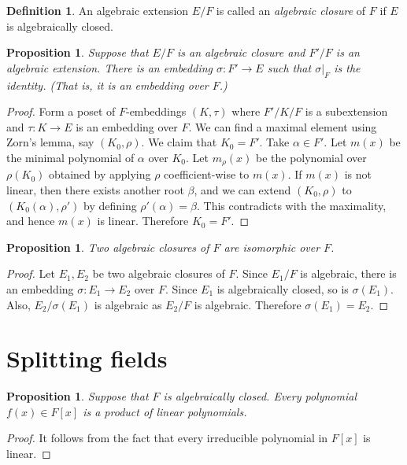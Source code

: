 \documentclass[12pt]{report}
\theoremstyle{plain}
\newtheorem{proposition}[theorem]{Proposition}
\theoremstyle{remark}
\theoremstyle{definition}
\newtheorem{definition}[theorem]{Definition}
\begin{document}
\begin{definition}
    An algebraic extension $E/F$ is called an \emph{algebraic closure} of $F$ if $E$ is algebraically closed.
\end{definition}

\begin{proposition}
    Suppose that $E/F$ is an algebraic closure and $F'/F$ is an algebraic extension. There is an embedding $\sigma:F'\rightarrow E$ such that $\sigma|_F$ is the identity. (That is, it is an embedding over $F$.)
\end{proposition}
\begin{proof}
    Form a poset of $F$-embeddings $(K,\tau)$ where $F'/K/F$ is a subextension and $\tau:K\rightarrow E$ is an embedding over $F$. We can find a maximal element using Zorn's lemma, say $(K_0,\rho)$. We claim that $K_0=F'$. Take $\alpha\in F'$. Let $m(x)$ be the minimal polynomial of $\alpha$ over $K_0$. Let $m_\rho(x)$ be the polynomial over $\rho(K_0)$ obtained by applying $\rho$ coefficient-wise to $m(x)$. If $m(x)$ is not linear, then there exists another root $\beta$, and we can extend $(K_0,\rho)$ to $(K_0(\alpha),\rho')$ by defining $\rho'(\alpha)=\beta$. This contradicts with the maximality, and hence $m(x)$ is linear. Therefore $K_0=F'$.
\end{proof}

\begin{proposition}
    Two algebraic closures of $F$ are isomorphic over $F$.
\end{proposition}
\begin{proof}
    Let $E_1,E_2$ be two algebraic closures of $F$. Since $E_1/F$ is algebraic, there is an embedding $\sigma:E_1\rightarrow E_2$ over $F$. Since $E_1$ is algebraically closed, so is $\sigma(E_1)$. Also, $E_2/\sigma(E_1)$ is algebraic as $E_2/F$ is algebraic. Therefore $\sigma(E_1)=E_2$.
\end{proof}


\section{Splitting fields}

\begin{proposition}
    Suppose that $F$ is algebraically closed. Every polynomial $f(x)\in F[x]$ is a product of linear polynomials.
\end{proposition}
\begin{proof}
    It follows from the fact that every irreducible polynomial in $F[x]$ is linear.
\end{proof}
\end{document}
